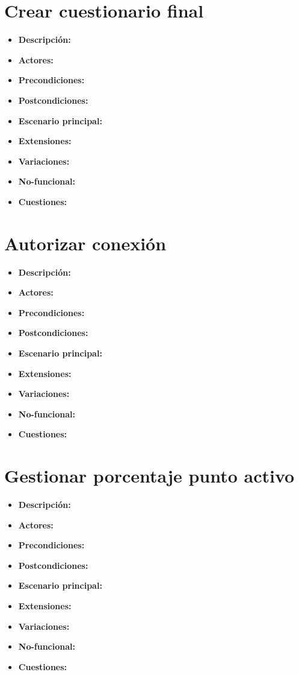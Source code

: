 \documentclass[12pt,letterpaper]{article}
\begin{document}
\section{Crear cuestionario final}
\begin{itemize}
	\item \textbf{Descripción:}
	\item \textbf{Actores:}
	\item \textbf{Precondiciones:}
	\item \textbf{Postcondiciones:}
	\item \textbf{Escenario principal:}
	\item \textbf{Extensiones:}
	\item \textbf{Variaciones:}
	\item \textbf{No-funcional:}
	\item \textbf{Cuestiones:}
\end{itemize}

\section{Autorizar conexión}
\begin{itemize}
	\item \textbf{Descripción:}
	\item \textbf{Actores:}
	\item \textbf{Precondiciones:}
	\item \textbf{Postcondiciones:}
	\item \textbf{Escenario principal:}
	\item \textbf{Extensiones:}
	\item \textbf{Variaciones:}
	\item \textbf{No-funcional:}
	\item \textbf{Cuestiones:}
\end{itemize}

\section{Gestionar porcentaje punto activo}
\begin{itemize}
	\item \textbf{Descripción:}
	\item \textbf{Actores:}
	\item \textbf{Precondiciones:}
	\item \textbf{Postcondiciones:}
	\item \textbf{Escenario principal:}
	\item \textbf{Extensiones:}
	\item \textbf{Variaciones:}
	\item \textbf{No-funcional:}
	\item \textbf{Cuestiones:}
\end{itemize}
\end{document}
